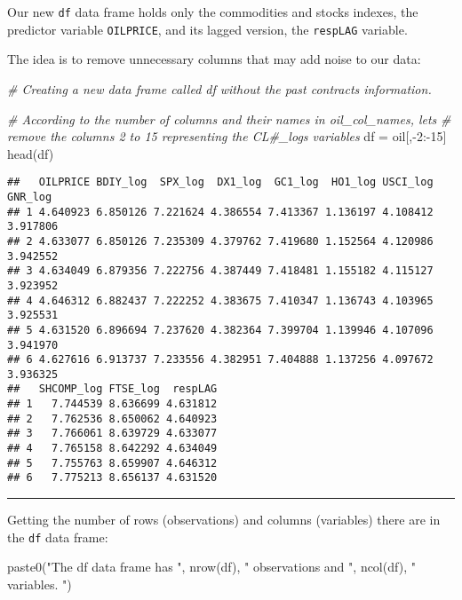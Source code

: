 \documentclass[
]{article}
\newenvironment{Shaded}{\begin{snugshade}}{\end{snugshade}}
\newcommand{\CommentTok}[1]{\textcolor[rgb]{0.56,0.35,0.01}{\textit{#1}}}
\newcommand{\DecValTok}[1]{\textcolor[rgb]{0.00,0.00,0.81}{#1}}
\newcommand{\FunctionTok}[1]{\textcolor[rgb]{0.00,0.00,0.00}{#1}}
\newcommand{\NormalTok}[1]{#1}
\newcommand{\OtherTok}[1]{\textcolor[rgb]{0.56,0.35,0.01}{#1}}
\newcommand{\SpecialCharTok}[1]{\textcolor[rgb]{0.00,0.00,0.00}{#1}}
\newcommand{\StringTok}[1]{\textcolor[rgb]{0.31,0.60,0.02}{#1}}
\begin{document}
Our new \texttt{df} data frame holds only the commodities and stocks
indexes, the predictor variable \texttt{OILPRICE}, and its lagged
version, the \texttt{respLAG} variable.

The idea is to remove unnecessary columns that may add noise to our
data:

\begin{Shaded}
\begin{Highlighting}[]
\CommentTok{\# Creating a new data frame called \textquotesingle{}df\textquotesingle{} without the past contracts information.}

\CommentTok{\# According to the number of columns and their names in \textquotesingle{}oil\_col\_names\textquotesingle{}, lets}
\CommentTok{\# remove the columns 2 to 15 representing the \textquotesingle{}CL\#\_log\textquotesingle{}s variables}
\NormalTok{df }\OtherTok{=}\NormalTok{ oil[,}\SpecialCharTok{{-}}\DecValTok{2}\SpecialCharTok{:{-}}\DecValTok{15}\NormalTok{]}
\FunctionTok{head}\NormalTok{(df)}
\end{Highlighting}
\end{Shaded}

\begin{verbatim}
##   OILPRICE BDIY_log  SPX_log  DX1_log  GC1_log  HO1_log USCI_log  GNR_log
## 1 4.640923 6.850126 7.221624 4.386554 7.413367 1.136197 4.108412 3.917806
## 2 4.633077 6.850126 7.235309 4.379762 7.419680 1.152564 4.120986 3.942552
## 3 4.634049 6.879356 7.222756 4.387449 7.418481 1.155182 4.115127 3.923952
## 4 4.646312 6.882437 7.222252 4.383675 7.410347 1.136743 4.103965 3.925531
## 5 4.631520 6.896694 7.237620 4.382364 7.399704 1.139946 4.107096 3.941970
## 6 4.627616 6.913737 7.233556 4.382951 7.404888 1.137256 4.097672 3.936325
##   SHCOMP_log FTSE_log  respLAG
## 1   7.744539 8.636699 4.631812
## 2   7.762536 8.650062 4.640923
## 3   7.766061 8.639729 4.633077
## 4   7.765158 8.642292 4.634049
## 5   7.755763 8.659907 4.646312
## 6   7.775213 8.656137 4.631520
\end{verbatim}

\begin{center}\rule{0.5\linewidth}{0.5pt}\end{center}

Getting the number of rows (observations) and columns (variables) there
are in the \texttt{df} data frame:

\begin{Shaded}
\begin{Highlighting}[]
\FunctionTok{paste0}\NormalTok{(}\StringTok{"The \textquotesingle{}df\textquotesingle{} data frame has "}\NormalTok{, }\FunctionTok{nrow}\NormalTok{(df), }\StringTok{" observations and  "}\NormalTok{, }\FunctionTok{ncol}\NormalTok{(df), }\StringTok{" variables. "}\NormalTok{)}
\end{Highlighting}
\end{Shaded}
\end{document}
